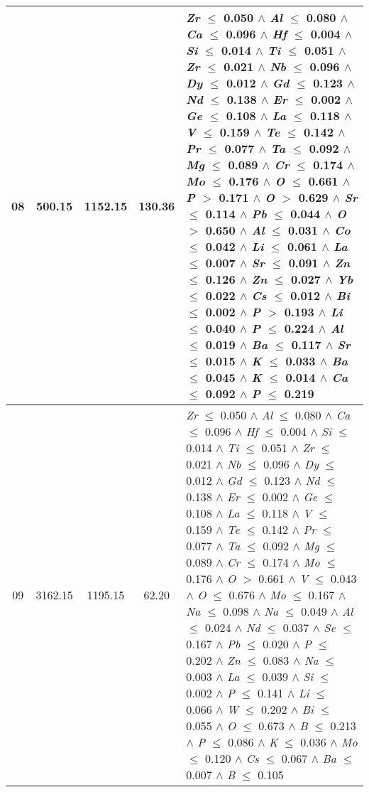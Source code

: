 \begin{table}[!htbp]
\begin{tabular}{ccccm{}}
		\hline
		08 & 500.15 & 1152.15 & 130.36 & \textit{Zr} $\le$ 0.050 $\wedge$ \textit{Al} $\le$ 0.080 $\wedge$ \textit{Ca} $\le$ 0.096 $\wedge$ \textit{Hf} $\le$ 0.004 $\wedge$ \textit{Si} $\le$ 0.014 $\wedge$ \textit{Ti} $\le$ 0.051 $\wedge$ \textit{Zr} $\le$ 0.021 $\wedge$ \textit{Nb} $\le$ 0.096 $\wedge$ \textit{Dy} $\le$ 0.012 $\wedge$ \textit{Gd} $\le$ 0.123 $\wedge$ \textit{Nd} $\le$ 0.138 $\wedge$ \textit{Er} $\le$ 0.002 $\wedge$ \textit{Ge} $\le$ 0.108 $\wedge$ \textit{La} $\le$ 0.118 $\wedge$ \textit{V} $\le$ 0.159 $\wedge$ \textit{Te} $\le$ 0.142 $\wedge$ \textit{Pr} $\le$ 0.077 $\wedge$ \textit{Ta} $\le$ 0.092 $\wedge$ \textit{Mg} $\le$ 0.089 $\wedge$ \textit{Cr} $\le$ 0.174 $\wedge$ \textit{Mo} $\le$ 0.176 $\wedge$ \textit{O} $\le$ 0.661 $\wedge$ \textit{P} $>$ 0.171 $\wedge$ \textit{O} $>$ 0.629 $\wedge$ \textit{Sr} $\le$ 0.114 $\wedge$ \textit{Pb} $\le$ 0.044 $\wedge$ \textit{O} $>$ 0.650 $\wedge$ \textit{Al} $\le$ 0.031 $\wedge$ \textit{Co} $\le$ 0.042 $\wedge$ \textit{Li} $\le$ 0.061 $\wedge$ \textit{La} $\le$ 0.007 $\wedge$ \textit{Sr} $\le$ 0.091 $\wedge$ \textit{Zn} $\le$ 0.126 $\wedge$ \textit{Zn} $\le$ 0.027 $\wedge$ \textit{Yb} $\le$ 0.022 $\wedge$ \textit{Cs} $\le$ 0.012 $\wedge$ \textit{Bi} $\le$ 0.002 $\wedge$ \textit{P} $>$ 0.193 $\wedge$ \textit{Li} $\le$ 0.040 $\wedge$ \textit{P} $\le$ 0.224 $\wedge$ \textit{Al} $\le$ 0.019 $\wedge$ \textit{Ba} $\le$ 0.117 $\wedge$ \textit{Sr} $\le$ 0.015 $\wedge$ \textit{K} $\le$ 0.033 $\wedge$ \textit{Ba} $\le$ 0.045 $\wedge$ \textit{K} $\le$ 0.014 $\wedge$ \textit{Ca} $\le$ 0.092 $\wedge$ \textit{P} $\le$ 0.219\\
		\hline
		09 & 3162.15 & 1195.15 & 62.20 & \textit{Zr} $\le$ 0.050 $\wedge$ \textit{Al} $\le$ 0.080 $\wedge$ \textit{Ca} $\le$ 0.096 $\wedge$ \textit{Hf} $\le$ 0.004 $\wedge$ \textit{Si} $\le$ 0.014 $\wedge$ \textit{Ti} $\le$ 0.051 $\wedge$ \textit{Zr} $\le$ 0.021 $\wedge$ \textit{Nb} $\le$ 0.096 $\wedge$ \textit{Dy} $\le$ 0.012 $\wedge$ \textit{Gd} $\le$ 0.123 $\wedge$ \textit{Nd} $\le$ 0.138 $\wedge$ \textit{Er} $\le$ 0.002 $\wedge$ \textit{Ge} $\le$ 0.108 $\wedge$ \textit{La} $\le$ 0.118 $\wedge$ \textit{V} $\le$ 0.159 $\wedge$ \textit{Te} $\le$ 0.142 $\wedge$ \textit{Pr} $\le$ 0.077 $\wedge$ \textit{Ta} $\le$ 0.092 $\wedge$ \textit{Mg} $\le$ 0.089 $\wedge$ \textit{Cr} $\le$ 0.174 $\wedge$ \textit{Mo} $\le$ 0.176 $\wedge$ \textit{O} $>$ 0.661 $\wedge$ \textit{V} $\le$ 0.043 $\wedge$ \textit{O} $\le$ 0.676 $\wedge$ \textit{Mo} $\le$ 0.167 $\wedge$ \textit{Na} $\le$ 0.098 $\wedge$ \textit{Na} $\le$ 0.049 $\wedge$ \textit{Al} $\le$ 0.024 $\wedge$ \textit{Nd} $\le$ 0.037 $\wedge$ \textit{Se} $\le$ 0.167 $\wedge$ \textit{Pb} $\le$ 0.020 $\wedge$ \textit{P} $\le$ 0.202 $\wedge$ \textit{Zn} $\le$ 0.083 $\wedge$ \textit{Na} $\le$ 0.003 $\wedge$ \textit{La} $\le$ 0.039 $\wedge$ \textit{Si} $\le$ 0.002 $\wedge$ \textit{P} $\le$ 0.141 $\wedge$ \textit{Li} $\le$ 0.066 $\wedge$ \textit{W} $\le$ 0.202 $\wedge$ \textit{Bi} $\le$ 0.055 $\wedge$ \textit{O} $\le$ 0.673 $\wedge$ \textit{B} $\le$ 0.213 $\wedge$ \textit{P} $\le$ 0.086 $\wedge$ \textit{K} $\le$ 0.036 $\wedge$ \textit{Mo} $\le$ 0.120 $\wedge$ \textit{Cs} $\le$ 0.067 $\wedge$ \textit{Ba} $\le$ 0.007 $\wedge$ \textit{B} $\le$ 0.105\\

\end{tabular}
\end{table}
